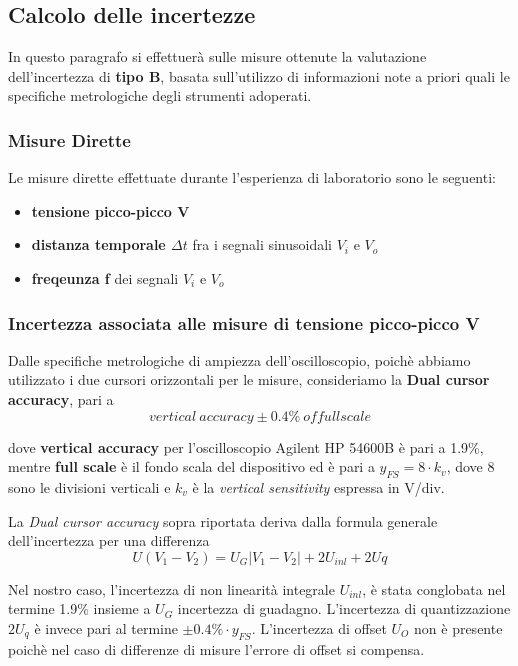 
\clearpage
\subsection{Calcolo delle incertezze}
In questo paragrafo si effettuerà sulle misure ottenute la valutazione dell'incertezza di \textbf{tipo B}, basata sull'utilizzo di informazioni note a priori quali le specifiche metrologiche degli strumenti adoperati.

\subsubsection{Misure Dirette}
Le misure dirette effettuate durante l'esperienza di laboratorio sono le seguenti:
\begin{itemize}
    \item \textbf{tensione picco-picco V}
    \item \textbf{distanza temporale $\Delta t$}  fra i segnali sinusoidali $V_i$ e $V_o$
    \item \textbf{freqeunza f} dei segnali $V_i$ e $V_o$ 
\end{itemize}

\subsubsection*{Incertezza associata alle misure di tensione picco-picco V}
Dalle specifiche metrologiche di ampiezza dell'oscilloscopio, poichè abbiamo utilizzato i due cursori orizzontali per le misure, consideriamo la \textbf{Dual cursor accuracy}, pari a 
\[vertical \ accuracy \pm 0.4\% \ of full scale\]

dove \textbf{vertical accuracy} per l'oscilloscopio Agilent HP 54600B è pari a 1.9\%, mentre \textbf{full scale} è il fondo scala del dispositivo ed è pari a $y_{FS} = 8 \cdot k_v$, dove 8 sono le divisioni verticali e $k_v$ è la \emph{vertical sensitivity} espressa in V/div.

La \emph{Dual cursor accuracy} sopra riportata deriva dalla formula generale dell'incertezza per una differenza 
\[U(V_1 - V_2) = U_G|V_1 - V_2| + 2U_{inl} + 2U{q}\]

Nel nostro caso, l'incertezza di non linearità integrale $U_{inl}$, è stata conglobata nel termine 1.9\% insieme a $U_G$ incertezza di guadagno. L'incertezza di quantizzazione $2U_q$ è invece pari al termine $\pm 0.4\% \cdot y_{FS}$. L'incertezza di offset $U_O$ non è presente poichè nel caso di differenze di misure l'errore di offset si compensa.

